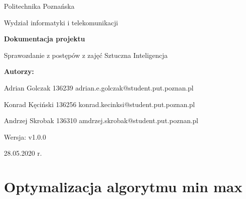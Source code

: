 \documentclass{article}
\newcommand{\version}{v1.0.0}
\begin{document}
\begin{titlepage}
		\begin{center}
			
						\LARGE
			Politechnika Poznańska
			
			\vspace{0.3cm}
			
			\large
			Wydział informatyki i telekomunikacji
			
			\vspace{3.0cm}
			\huge
			\textbf{Dokumentacja projektu}
			
			\vspace{0.5cm}
			
			\large
			Sprawozdanie z postępów z zajęć Sztuczna Inteligencja
			
			
			\LARGE
			\textbf{Autorzy:}
			
			
			Adrian Golczak 136239
			adrian.e.golczak@student.put.poznan.pl
			
			\vspace{1.0cm}
			
			Konrad Kęciński 136256
			konrad.kecinksi@student.put.poznan.pl
			
			\vspace{1.0cm}
			
			Andrzej Skrobak 136310
			amdrzej.skrobak@student.put.poznan.pl
			
			\vspace{0.3cm}

			\vfill
			
			\normalsize
			Wersja: \version
			
			\vspace{2cm}
			
			\hfil
			
			28.05.2020 r.
			
		\end{center}
\end{titlepage}

\tableofcontents
\newpage
\section{Optymalizacja algorytmu min max}

\end{document}
